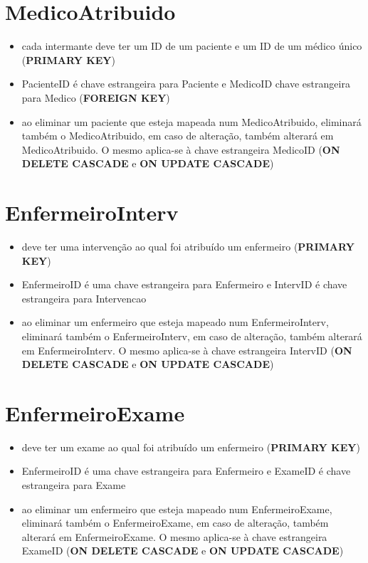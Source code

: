 \documentclass[article, a4paper, 12pt, oneside]{memoir}
\begin{document}
\section*{MedicoAtribuido}
\begin{itemize}
	\item cada intermante deve ter um ID de um paciente e um ID de um médico único (\textbf{PRIMARY KEY})
	\item PacienteID é chave estrangeira para Paciente e MedicoID chave estrangeira para Medico (\textbf{FOREIGN KEY})
	\item ao eliminar um paciente que esteja mapeada num MedicoAtribuido, eliminará também o MedicoAtribuido, em caso de alteração, também alterará em MedicoAtribuido. O mesmo aplica-se à chave estrangeira MedicoID (\textbf{ON DELETE CASCADE} e \textbf{ON UPDATE CASCADE})
\end{itemize}

\section*{EnfermeiroInterv}
\begin{itemize}
	\item deve ter uma intervenção ao qual foi atribuído um enfermeiro (\textbf{PRIMARY KEY})
	\item EnfermeiroID é uma chave estrangeira para Enfermeiro e IntervID é chave estrangeira para Intervencao
	\item ao eliminar um enfermeiro que esteja mapeado num EnfermeiroInterv, eliminará também o EnfermeiroInterv, em caso de alteração, também alterará em EnfermeiroInterv. O mesmo aplica-se à chave estrangeira IntervID (\textbf{ON DELETE CASCADE} e \textbf{ON UPDATE CASCADE})
\end{itemize}

\section*{EnfermeiroExame}
\begin{itemize}
	\item deve ter um exame ao qual foi atribuído um enfermeiro (\textbf{PRIMARY KEY})
	\item EnfermeiroID é uma chave estrangeira para Enfermeiro e ExameID é chave estrangeira para Exame
	\item ao eliminar um enfermeiro que esteja mapeado num EnfermeiroExame, eliminará também o EnfermeiroExame, em caso de alteração, também alterará em EnfermeiroExame. O mesmo aplica-se à chave estrangeira ExameID (\textbf{ON DELETE CASCADE} e \textbf{ON UPDATE CASCADE})
\end{itemize}
\end{document}
